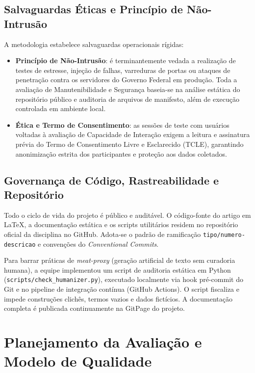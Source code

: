 \documentclass[journal]{IEEEtran}
\begin{document}
\subsection{Salvaguardas Éticas e Princípio de Não-Intrusão}
\label{sec:eticas}

A metodologia estabelece salvaguardas operacionais rígidas:
\begin{itemize}
    \item \textbf{Princípio de Não-Intrusão}: é terminantemente vedada a realização de testes de estresse, injeção de falhas, varreduras de portas ou ataques de penetração contra os servidores do Governo Federal em produção. Toda a avaliação de Manutenibilidade e Segurança baseia-se na análise estática do repositório público e auditoria de arquivos de manifesto, além de execução controlada em ambiente local.
    \item \textbf{Ética e Termo de Consentimento}: as sessões de teste com usuários voltadas à avaliação de Capacidade de Interação exigem a leitura e assinatura prévia do Termo de Consentimento Livre e Esclarecido (TCLE), garantindo anonimização estrita dos participantes e proteção aos dados coletados.
\end{itemize}

\subsection{Governança de Código, Rastreabilidade e Repositório}
\label{sec:governanca}

Todo o ciclo de vida do projeto é público e auditável. O código-fonte do artigo em LaTeX, a documentação estática e os scripts utilitários residem no repositório oficial da disciplina no GitHub. Adota-se o padrão de ramificação \texttt{tipo/numero-descricao} e convenções do \textit{Conventional Commits}. 

Para barrar práticas de \textit{meat-proxy} (geração artificial de texto sem curadoria humana), a equipe implementou um script de auditoria estática em Python (\texttt{scripts/check\_humanizer.py}), executado localmente via hook pré-commit do Git e no pipeline de integração contínua (GitHub Actions). O script fiscaliza e impede construções clichês, termos vazios e dados fictícios. A documentação completa é publicada continuamente na GitPage do projeto.

\section{Planejamento da Avaliação e Modelo de Qualidade}
\label{sec:fase1}
\end{document}
